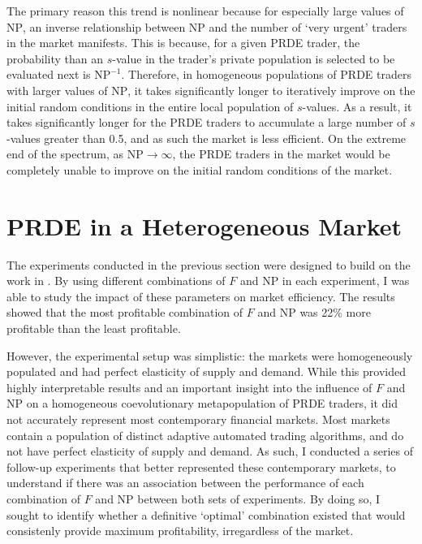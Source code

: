 \documentclass[conference]{IEEEtran}
\begin{document}
The primary reason this trend is nonlinear because for especially large values of $\mathrm{NP}$, an inverse relationship between $\mathrm{NP}$ and the number of `very urgent' traders in the market manifests.
This is because, for a given PRDE trader, the probability than an $s$-value in the trader's private population is selected to be evaluated next is $\mathrm{NP}^{-1}$.
Therefore, in homogeneous populations of PRDE traders with larger values of $\mathrm{NP}$, it takes significantly longer to iteratively improve on the initial random conditions in the entire local population of $s$-values.
As a result, it takes significantly longer for the PRDE traders to accumulate a large number of $s$-values greater than 0.5, and as such the market is less efficient.
On the extreme end of the spectrum, as $\mathrm{NP}\to\infty$, the PRDE traders in the market would be completely unable to improve on the initial random conditions of the market.

\section{PRDE in a Heterogeneous Market}

The experiments conducted in the previous section were designed to build on the work in \cite{PRDE}.
By using different combinations of $F$ and $\mathrm{NP}$ in each experiment, I was able to study the impact of these parameters on market efficiency.
The results showed that the most profitable combination of $F$ and $\mathrm{NP}$ was 22\% more profitable than the least profitable.

However, the experimental setup was simplistic: the markets were homogeneously populated and had perfect elasticity of supply and demand.
While this provided highly interpretable results and an important insight into the influence of $F$ and $\mathrm{NP}$ on a homogeneous coevolutionary metapopulation of PRDE traders, it did not accurately represent most contemporary financial markets.
Most markets contain a population of distinct adaptive automated trading algorithms, and do not have perfect elasticity of supply and demand.
As such, I conducted a series of follow-up experiments that better represented these contemporary markets, to understand if there was an association between the performance of each combination of $F$ and $\mathrm{NP}$ between both sets of experiments.
By doing so, I sought to identify whether a definitive `optimal' combination existed that would consistenly provide maximum profitability, irregardless of the market.
\end{document}
